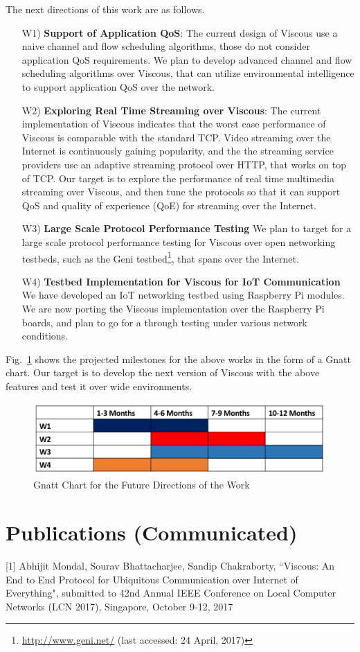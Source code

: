 The next directions of this work are as follows. 
\begin{enumerate}
	\item [W1)] \textbf{Support of Application QoS}: The current design of Viscous use a naive channel and flow scheduling algorithms, those do not consider application QoS requirements. We plan to develop advanced channel and flow scheduling algorithms over Viscous, that can utilize environmental intelligence to support application QoS over the network. 
	\item [W2)] \textbf{Exploring Real Time Streaming over Viscous}: The current implementation of Viscous indicates that the worst case performance of Viscous is comparable with the standard TCP. Video streaming over the Internet is continuously gaining popularity, and the the streaming service providers use an adaptive streaming protocol over HTTP, that works on top of TCP. Our target is to explore the performance of real time multimedia streaming over Viscous, and then tune the protocols so that it can support QoS and quality of experience (QoE) for streaming over the Internet. 
	\item [W3)] \textbf{Large Scale Protocol Performance Testing} We plan to target for a large scale protocol performance testing for Viscous over open networking testbeds, such as the Geni testbed\footnote{\url{http://www.geni.net/} (last accessed: 24 April, 2017)}, that spans over the Internet. 
	\item [W4)] \textbf{Testbed Implementation for Viscous for IoT Communication} We have developed an IoT networking testbed using Raspberry Pi modules. We are now porting the Viscous implementation over the Raspberry Pi boards, and plan to go for a through testing under various network conditions. 
\end{enumerate} 

Fig.~\ref{fig:future} shows the projected milestones for the above works in the form of a Gnatt chart. Our target is to develop the next version of Viscous with the above features and test it over wide environments. 

\begin{figure}[!h]
	\centering
	\includegraphics[width=0.6\linewidth]{img/future.png}
	\caption{Gnatt Chart for the Future Directions of the Work}
	\label{fig:future}
\end{figure}

\section*{Publications (Communicated)}

[1] Abhijit Mondal, Sourav Bhattacharjee, Sandip Chakraborty, ``Viscous: An End to End Protocol for Ubiquitous Communication over Internet of Everything", submitted to 42nd Annual IEEE Conference on Local Computer Networks (LCN 2017), Singapore, October 9-12, 2017